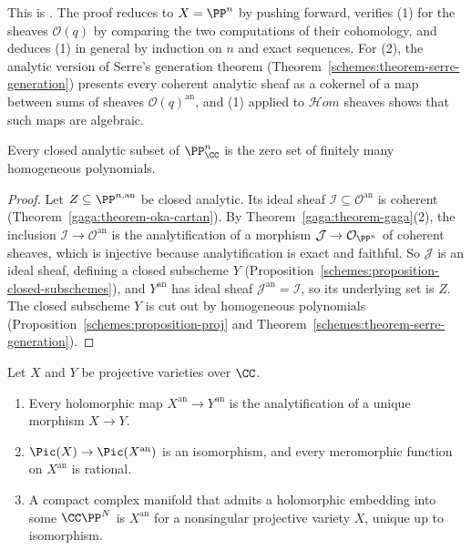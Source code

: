 This is \cite[Th\'eor\`emes 1--3]{serre-gaga}. The proof reduces to $X = \PP^n$ by pushing forward, verifies (1) for the sheaves $\mathcal{O}(q)$ by comparing the two
computations of their cohomology, and deduces (1) in general by induction on $n$ and exact sequences. For (2), the analytic version of Serre's generation theorem
(Theorem~\ref{schemes:theorem-serre-generation}) presents every coherent analytic sheaf as a cokernel of a map between sums of sheaves $\mathcal{O}(q)^{\mathrm{an}}$,
and (1) applied to $\mathcal{H}om$ sheaves shows that such maps are algebraic.

\begin{corollary}\label{gaga:corollary-chow}
Every closed analytic subset of $\PP^n_\CC$ is the zero set of finitely many homogeneous polynomials.
\end{corollary}

\begin{proof}
Let $Z \subseteq \PP^{n,\mathrm{an}}$ be closed analytic. Its ideal sheaf $\mathcal{I} \subseteq \mathcal{O}^{\mathrm{an}}$ is coherent (Theorem~\ref{gaga:theorem-oka-cartan}). By
Theorem~\ref{gaga:theorem-gaga}(2), the inclusion $\mathcal{I} \to \mathcal{O}^{\mathrm{an}}$ is the analytification of a morphism $\mathcal{J} \to \mathcal{O}_{\PP^n}$ of coherent sheaves,
which is injective because analytification is exact and faithful. So $\mathcal{J}$ is an ideal sheaf, defining a closed subscheme $Y$
(Proposition~\ref{schemes:proposition-closed-subschemes}), and $Y^{\mathrm{an}}$ has ideal sheaf $\mathcal{J}^{\mathrm{an}} = \mathcal{I}$, so its underlying set is $Z$. The
closed subscheme $Y$ is cut out by homogeneous polynomials (Proposition~\ref{schemes:proposition-proj} and Theorem~\ref{schemes:theorem-serre-generation}).
\end{proof}

\begin{corollary}\label{gaga:corollary-consequences}
Let $X$ and $Y$ be projective varieties over $\CC$.
\begin{enumerate}
\item Every holomorphic map $X^{\mathrm{an}} \to Y^{\mathrm{an}}$ is the analytification of a unique morphism $X \to Y$.
\item $\Pic(X) \to \Pic(X^{\mathrm{an}})$ is an isomorphism, and every meromorphic function on $X^{\mathrm{an}}$ is rational.
\item A compact complex manifold that admits a holomorphic embedding into some $\CC\PP^N$ is $X^{\mathrm{an}}$ for a nonsingular projective variety $X$, unique up to
isomorphism.
\end{enumerate}
\end{corollary}

